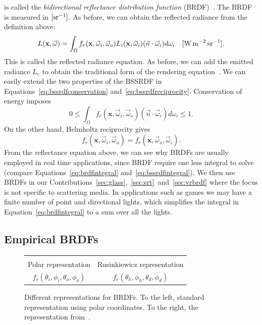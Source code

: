 is called the \emph{bidirectional reflectance distribution function} (BRDF)~\cite{Nicodemus1977}. The BRDF is measured in $\siunitnospace{\per \steradian}$. As before, we can obtain the reflected radiance from the definition above:
\begin{equation}
\label{eq:brdfintegral}
L(\mathbf{x}, \vec{\omega}) = \int_\Omega f_r(\mathbf{x}, \vec{\omega}_i,  \vec{\omega}_o) L_i(\mathbf{x}, \vec{\omega}_i) (\vec{n} \cdot \vec{\omega}_i) d{\omega}_i  \siunit{\watt \per \square \metre \per \steradian}.
\end{equation}
This is called the reflected radiance equation. As before, we can add the emitted radiance $L_e$ to obtain the traditional form of the rendering equation~\cite{Kajiya1986}. We can easily extend the two properties of the BSSRDF in Equations~\ref{eq:bssrdfconservation} and~\ref{eq:bssrdfreciprocity}. Conservation of energy imposes
\begin{equation*}
0 \leq \int_\Omega f_r(\mathbf{x}, \vec{\omega}_i,  \vec{\omega}_o)  (\vec{n} \cdot \vec{\omega}_i) d{\omega}_i \leq 1.
\end{equation*}
On the other hand, Helmholtz reciprocity gives
\begin{equation*}
f_r(\mathbf{x}, \vec{\omega}_i,  \vec{\omega}_o) = f_r(\mathbf{x}, \vec{\omega}_o,  \vec{\omega}_i).
\end{equation*}
From the reflectance equation above, we can see why BRDFs are usually employed in real time applications, since BRDF require one less integral to solve (compare Equations~\ref{eq:brdfintegral} and~\ref{eq:bssrdfintegral}). We then use BRDFs in our Contributions~\ref{sec:glass},~\ref{sec:srt}~and~\ref{sec:vrbrdf} where the focus is not specific to scattering media. In applications such as games we may have a finite number of point and directional lights, which simplifies the integral in Equation~\ref{eq:brdfintegral} to a sum over all the lights.

\subsection{Empirical BRDFs}
\label{sec:empiricalbrdf}
\begin{figure}
\centering
\begin{tabular}{@{}c@{\hskip 1em}c@{}}
\def\svgwidth{0.45\textwidth} &  \def\svgwidth{0.45\textwidth} \\
Polar representation &  Rusinkiewicz representation \\
$f_r(\theta_i, \phi_i, \theta_o, \phi_o)$ &  $f_r(\theta_h, \phi_h, \theta_d, \phi_d)$ \\
\end{tabular}
\caption{Different representations for BRDFs. To the left, standard representation using polar coordinates. To the right, the representation from~\cite{Rusinkiewicz1998}. } 
\label{fig:brdfrepr}
\end{figure}

